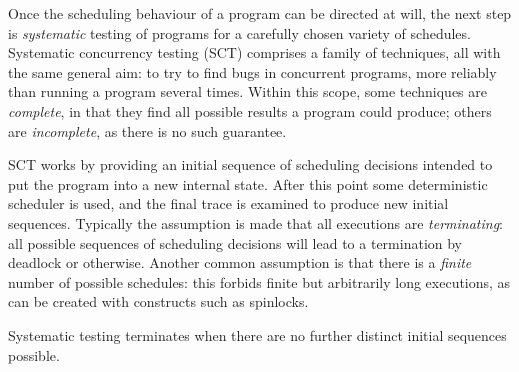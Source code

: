 Once the scheduling behaviour of a program can be directed at will,
the next step is \emph{systematic} testing of programs for a carefully
chosen variety of schedules. Systematic concurrency testing (SCT)
comprises a family of techniques, all with the same general aim: to
try to find bugs in concurrent programs, more reliably than running a
program several times. Within this scope, some techniques are
\emph{complete}, in that they find all possible results a program
could produce; others are \emph{incomplete}, as there is no such
guarantee.

SCT works by providing an initial sequence of scheduling decisions
intended to put the program into a new internal state. After this
point some deterministic scheduler is used, and the final trace is
examined to produce new initial sequences. Typically the assumption is
made that all executions are \emph{terminating}: all possible
sequences of scheduling decisions will lead to a termination by
deadlock or otherwise. Another common assumption is that there is a
\emph{finite} number of possible schedules: this forbids finite but
arbitrarily long executions, as can be created with constructs such as
spinlocks.

Systematic testing terminates when there are no further distinct
initial sequences possible.
